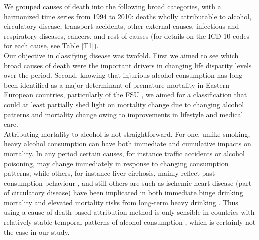\documentclass{article}
\begin{document}
\begin{spacing}{1.5}
\textcolor[rgb]{0,0.58,0}{We grouped causes of death into the following broad categories, with a harmonized time series from 1994 to 2010:  deaths wholly attributable to alcohol, circulatory disease, transport accidents, other external causes, infectious and respiratory diseases, cancers, and rest of causes (for details on the ICD-10 codes for each cause, see Table \ref{T1}). \\
Our objective in classifying disease was twofold. First we aimed to see which broad causes of death were the important drivers in changing life disparity levels over the period. Second, knowing that injurious alcohol consumption has long been identified as a major determinant of premature mortality in Eastern European countries, particularly of the FSU \citep{leon1997huge,mckee2001,rehm2007,grigoriev2015}, we aimed for a classification that could at least partially shed light on mortality change due to changing alcohol patterns and mortality change owing to improvements in lifestyle and medical care. \\
Attributing mortality to alcohol is not straightforward. For one, unlike smoking, heavy alcohol consumption can have both immediate and cumulative impacts on mortality. In any period certain causes, for instance traffic accidents or alcohol poisoning, may change immediately in response to changing consumption patterns, while others, for instance liver cirrhosis, mainly reflect past consumption behaviour \citep{ menon2001pathogenesis, rehm2003relationship}, and still others are such as ischemic heart disease (part of circulatory disease) have been implicated in both immediate binge drinking mortality \citep{kauhanen1997beer} and elevated mortality risks from long-term heavy drinking \citep{roerecke2014alcohol}. Thus using a cause of death based attribution method is only sensible in countries with relatively stable temporal patterns of alcohol consumption \citep{kraus2015changes,martikainen2014income}, which is certainly not the case in our study. \\
}
\end{spacing}
\end{document}
